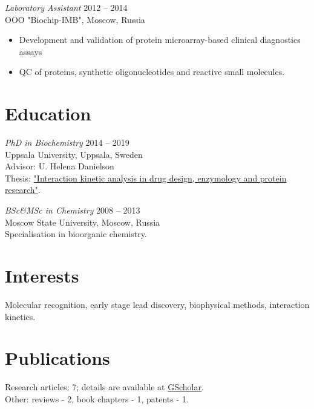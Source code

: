 \documentclass[margin]{res}
\begin{document}
\begin{resume}
{\sl Laboratory Assistant} \hfill 2012 -- 2014 \\
OOO "Biochip-IMB", Moscow, Russia
\begin{itemize}
\setlength\itemsep{0em}
\item Development and validation of protein microarray-based clinical diagnostics assays
\item QC of proteins, synthetic oligonucleotides and reactive small molecules.
\end{itemize}
 
\section{Education} {\sl PhD in Biochemistry} \hfill 2014 -- 2019 \\
Uppsala University, Uppsala, Sweden \\
Advisor: U. Helena Danielson \\
Thesis: \href{http://uu.diva-portal.org/smash/record.jsf?pid=diva2%3A1256395&dswid=214}{"Interaction kinetic analysis in drug design, enzymology and protein research"}.

{\sl BSc\&MSc in Chemistry} \hfill 2008 -- 2013 \\
Moscow State University, Moscow, Russia \\
Specialisation in bioorganic chemistry.
                
\section{Interests} Molecular recognition, early stage lead discovery, biophysical methods, interaction kinetics.
 


\newpage

\section{Publications}
\nocite{*}
Research articles: 7; details are available at \href{https://scholar.google.com/citations?hl=sv&user=H5uK2zsAAAAJ&view_op=list_works&authuser=2&sortby=pubdate}{GScholar}.\\
Other: reviews - 2, book chapters - 1, patents  - 1.\\
\printbibliography[heading=none]
\end{resume}
\end{document}

